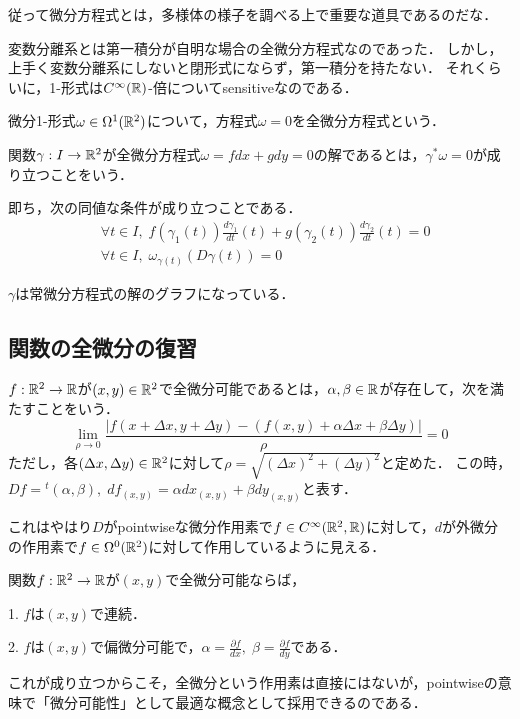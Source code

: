 \documentclass[uplatex,dvipdfmx]{jsreport}
\begin{document}
従って微分方程式とは，多様体の様子を調べる上で重要な道具であるのだな．

変数分離系とは第一積分が自明な場合の全微分方程式なのであった．
しかし，上手く変数分離系にしないと閉形式にならず，第一積分を持たない．
それくらいに，1-形式は$C^\infty(\mathbb{R})$-倍についてsensitiveなのである．

\begin{definition}[全微分方程式]
    微分1-形式$\omega\in\Omega^1(\mathbb{R}^2)$について，方程式$\omega=0$を全微分方程式という．
\end{definition}
\begin{definition}[全微分方程式の解]
    関数$\gamma:I\to\mathbb{R}^2$が全微分方程式$\omega=fdx+gdy=0$の解であるとは，$\gamma^*\omega=0$が成り立つことをいう．

    即ち，次の同値な条件が成り立つことである．
    \begin{align*}
        &\forall t\in I,\;f(\gamma_1(t))\frac{d\gamma_1}{dt}(t) + g(\gamma_2(t))\frac{d\gamma_2}{dt}(t) = 0\\
        &\forall t\in I,\; \omega_{\gamma(t)}(D\gamma(t))=0
    \end{align*}
\end{definition}
$\gamma$は常微分方程式の解のグラフになっている．

\subsection{関数の全微分の復習}

\begin{definition}[（全）微分可能]
    $f:\mathbb{R}^2\to\mathbb{R}$が$(x,y)\in\mathbb{R}^2$で全微分可能であるとは，$\alpha,\beta\in\mathbb{R}$が存在して，次を満たすことをいう．
    \[ \lim_{\rho\to 0}\frac{|f(x+\Delta x,y+\Delta y)-(f(x,y)+\alpha\Delta x+\beta\Delta y) |}{\rho}=0 \]
    ただし，各$(\Delta x,\Delta y)\in\mathbb{R}^2$に対して$\rho=\sqrt{(\Delta x)^2+(\Delta y)^2}$と定めた．
    この時，$Df={}^t(\alpha,\beta),\;df_{(x,y)}=\alpha dx_{(x,y)}+\beta dy_{(x,y)}$と表す．
\end{definition}
これはやはり$D$がpointwiseな微分作用素で$f\in C^\infty(\mathbb{R}^2,\mathbb{R})$に対して，$d$が外微分の作用素で$f\in\Omega^0(\mathbb{R}^2)$に対して作用しているように見える．

\begin{theorem}
    関数$f:\mathbb{R}^2\to\mathbb{R}$が$(x,y)$で全微分可能ならば，

    1. $f$は$(x,y)$で連続．

    2. $f$は$(x,y)$で偏微分可能で，$\alpha=\frac{\partial f}{dx},\;\beta=\frac{\partial f}{dy}$である．
\end{theorem}
これが成り立つからこそ，全微分という作用素は直接にはないが，pointwiseの意味で「微分可能性」として最適な概念として採用できるのである．
\end{document}
